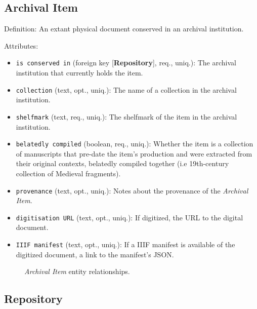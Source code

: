 
\subsection{Archival Item}

Definition: An extant physical document conserved in an archival institution.

\vspace{1em}
\noindent Attributes:

\begin{itemize}
    \item \texttt{is conserved in} (foreign key [\textbf{Repository}], req., uniq.): The archival institution that currently holds the item.
    \item \texttt{collection} (text, opt., uniq.): The name of a collection in the archival institution.
    \item \texttt{shelfmark} (text, req., uniq.): The shelfmark of the item in the archival institution.
    \item \texttt{belatedly compiled} (boolean, req., uniq.): Whether the item is a collection of manuscripts that pre-date the item's production and were extracted from their original contexts, belatedly compiled together (i.e 19th-century collection of Medieval fragments).
    \item \texttt{provenance} (text, opt., uniq.): Notes about the provenance of the \textit{Archival Item}.
    \item \texttt{digitisation URL} (text, opt., uniq.): If digitized, the URL to the digital document.
    \item \texttt{IIIF manifest} (text, opt., uniq.): If a IIIF manifest is available of the digitized document, a link to the manifest's JSON.
\end{itemize}

\begin{figure}[ht]
    \begin{center}
        
    \end{center}
\label{fig:ArchivalER}
\caption{\textit{Archival Item} entity relationships.}
\end{figure}


\subsection{Repository}

